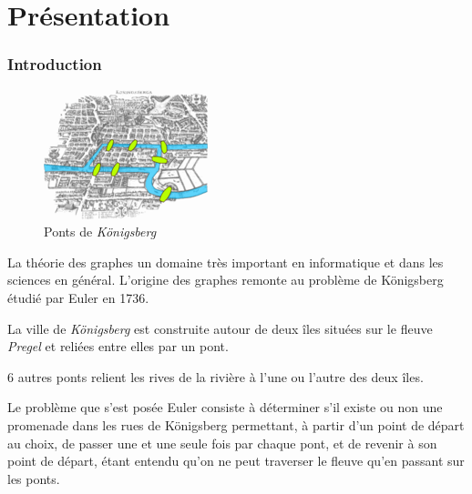 

\section{Présentation} 

\begin{frame}[fragile]
\frametitle{Introduction}

\begin{figure}
\vspace{-0.5cm}
  \begin{center}
    \includegraphics[width=0.9\linewidth]{img/Konigsberg_bridges}
  \end{center}
  \caption{Ponts de \textit{Königsberg}}
\end{figure}

La théorie des graphes un domaine très important en informatique et dans les sciences en général. L'origine des graphes remonte au problème de Königsberg étudié par Euler en 1736.

La ville de \textit{Königsberg} est construite autour de deux îles situées sur le fleuve \textit{Pregel} et reliées entre elles par un pont.

6 autres ponts relient les rives de la rivière à l'une ou l'autre des deux îles.

Le problème que s'est posée Euler consiste à déterminer s'il existe ou non une promenade dans les rues de Königsberg permettant, à partir d'un point de départ au choix, de passer une et une seule fois par chaque pont, et de revenir à son point de départ, étant entendu qu'on ne peut traverser le fleuve qu'en passant sur les ponts.
\end{frame}

